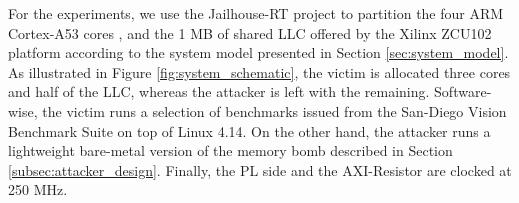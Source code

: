 %


    For the experiments, we use the Jailhouse-RT project \cite{ewarp2020rtss} to partition the four ARM Cortex-A53 cores \cite{ARM-cortex-A53}, and the 1 MB of shared LLC offered by the Xilinx ZCU102 platform \cite{Xilinx-ULTRASCALE-TRM} according to the system model presented in Section \ref{sec:system_model}.
    As illustrated in Figure \ref{fig:system_schematic}, the victim is allocated three cores and half of the LLC, whereas the attacker is left with the remaining.
    Software-wise, the victim runs a selection of benchmarks issued from the San-Diego Vision Benchmark Suite \cite{SD-VBS} on top of Linux 4.14.
    On the other hand, the attacker runs a lightweight bare-metal version of the memory bomb described in Section \ref{subsec:attacker_design}.
    Finally, the PL side and the AXI-Resistor are clocked at 250 MHz.\\


